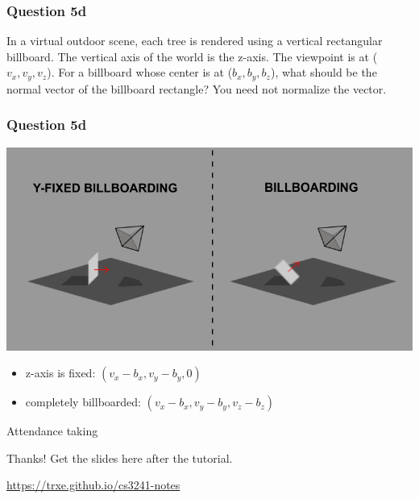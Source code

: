 \documentclass{beamer}
\begin{document}
\begin{frame}
    \frametitle{Question 5d}

    In a virtual outdoor scene, each tree is rendered using a vertical rectangular billboard. 
    The vertical axis of the world is the z-axis. The viewpoint is at ($v_x, v_y, v_z$). 
    For a billboard whose center is at ($b_x, b_y, b_z$), what should be the normal vector of the billboard rectangle? 
    You need not normalize the vector.

\end{frame}

\begin{frame}
    \frametitle{Question 5d}

    \begin{center}
        \includegraphics[scale=0.35]{billboarding.png}
    \end{center}

    \begin{tcolorbox}
        \begin{itemize}
            \item z-axis is fixed: $(v_x - b_x, v_y - b_y, 0)$
            \item completely billboarded: $(v_x - b_x, v_y - b_y, v_z - b_z)$
        \end{itemize}
    \end{tcolorbox}

\end{frame}

\begin{frame}
    \AlegreyaExtraBold \LARGE
    Attendance taking
\end{frame}

\ThankYou
\begin{frame}
    Thanks! Get the slides here after the tutorial.\\
    \vspace{2em}
    \scalebox{3}{\faGithub}\par\bigskip
    \url{https://trxe.github.io/cs3241-notes}
\end{frame}
\end{document}
